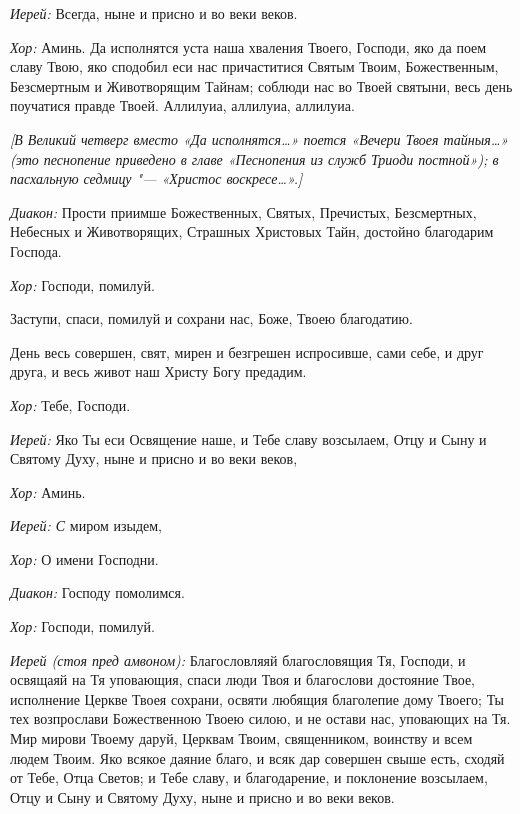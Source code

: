 \begin{mymulticols}
{\itshape Иерей:} Всегда, ныне и присно и во веки веков.

{\itshape Хор:} Аминь. Да исполнятся уста наша хваления Твоего, Господи, яко да поем славу Твою, яко сподобил еси нас причаститися Святым Твоим, Божественным, Безсмертным и Животворящим Тайнам; соблюди нас во Твоей святыни, весь день поучатися правде Твоей. Аллилуиа, аллилуиа, аллилуиа. 

{\itshape [В Великий четверг вместо «Да исполнятся…» поется «Вечери Твоея тайныя…» (это песнопение приведено в главе «Песнопения из служб Триоди постной»); в пасхальную седмицу "--- «Христос воскресе…».]}


{\itshape Диакон:} Прости приимше Божественных, Святых, Пречистых, Безсмертных, Небесных и Животворящих, Страшных Христовых Тайн, достойно благодарим Господа. 

{\itshape Хор:} Господи, помилуй. 

Заступи, спаси, помилуй и сохрани нас, Боже, Твоею благодатию. 

День весь совершен, свят, мирен и безгрешен испросивше, сами себе, и друг друга, и весь живот наш Христу Богу предадим. 

{\itshape Хор:} Тебе, Господи. 

{\itshape Иерей:} Яко Ты еси Освящение наше, и Тебе славу возсылаем, Отцу и Сыну и Святому Духу, ныне и присно и во веки веков,

{\itshape Хор:} Аминь.

{\itshape Иерей: С} миром изыдем, 

{\itshape Хор:} О имени Господни. 

{\itshape Диакон:} Господу помолимся.

{\itshape Хор:} Господи, помилуй. 


{\itshape  Иерей (стоя пред амвоном):} Благословляяй благословящия Тя, Господи, и освящаяй на Тя уповающия, спаси люди Твоя и благослови достояние Твое, исполнение Церкве Твоея сохрани, освяти любящия благолепие дому Твоего; Ты тех возпрослави Божественною Твоею силою, и не остави нас, уповающих на Тя. Мир мирови Твоему даруй, Церквам Твоим, священником, воинству и всем людем Твоим. Яко всякое даяние благо, и всяк дар совершен свыше есть, сходяй от Тебе, Отца Светов; и Тебе славу, и благодарение, и поклонение возсылаем, Отцу и Сыну и Святому Духу, ныне и присно и во веки веков. 


\end{mymulticols}
